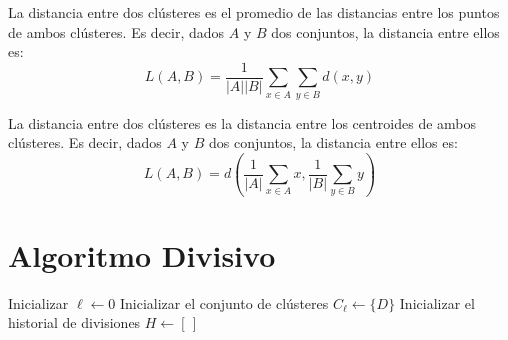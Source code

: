 \documentclass[a4,11pt]{aleph-notas}
\begin{document}
\begin{defi}
    La distancia entre dos clústeres es el promedio de las distancias entre los puntos de ambos clústeres. Es decir, dados $A$ y $B$ dos conjuntos, la distancia entre ellos es:
    \[
        L(A,B) = \frac{1}{|A||B|} \sum_{x \in A} \sum_{y \in B} d(x,y)
    \]  
\end{defi}

\begin{defi}
    La distancia entre dos clústeres es la distancia entre los centroides de ambos clústeres. Es decir, dados $A$ y $B$ dos conjuntos, la distancia entre ellos es:
    \[
        L(A,B) = d\left( \frac{1}{|A|} \sum_{x \in A} x, \frac{1}{|B|} \sum_{y \in B} y \right)
    \]
\end{defi}

\section{Algoritmo Divisivo}

\begin{algorithm}[H]
   
    \caption{Pseudocódigo del agrupamiento jerárquico divisivo (DHC)}
    
    
    Inicializar $\ell \leftarrow 0$\;
    Inicializar el conjunto de clústeres $C_\ell \leftarrow \{D\}$\;
    Inicializar el historial de divisiones $H \leftarrow [\,]$\;
    
    
\end{algorithm}
\end{document}
